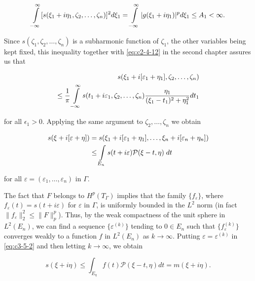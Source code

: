 \[
\intop_{-\infty}^{\infty}[s(\xi_{1}+i\eta_{1},\zeta_{2},\ldots,\zeta_{n})]^{2}d\xi_{1}=\intop_{-\infty}^{\infty}|g(\xi_{1}+i\eta_{1})|^{p}d\xi_{1}\leq A_{1}<\infty.
\]

Since $s(\zeta_1, \zeta_2, \ldots, \zeta_n)$ is a subharmonic function of $\zeta_1$, the other variables being kept fixed, this inequality together with \eqref{eq:c2-4-12} in the second chapter assures us that

\[
\begin{aligned}{s(\xi_{1}+i[\varepsilon_{1}+\eta_{1}],\zeta_{2},\ldots,\zeta_{n})}\\ {\leq\frac{1}{\pi}\intop_{-\infty}^{\infty}s(t_{1}+i\varepsilon_{1},\zeta_{2},\ldots,\zeta_{n})\frac{\eta_{1}}{(\xi_{1}-t_{1})^{2}+\eta_{1}^{2}}d t_{1}}\\ \end{aligned}
\]

for all $\epsilon_1 > 0$. Applying the same argument to $\zeta_2, \ldots, \zeta_n$ we obtain

\begin{equation}\label{eq:c3-5-2}
\begin{aligned}{s(\xi+i[\varepsilon+\eta])}&{{}=s(\xi_{1}+i[\varepsilon_{1}+\eta_{1}],\ldots,\xi_{n}+i[\varepsilon_{n}+\eta_{n}])}\\ {}&{{}\leq\intop_{E_{n}}s(t+i\varepsilon)\mathcal{P}(\xi-t,\eta)\;d t}\\ \end{aligned}
\end{equation}

for all $\varepsilon=(\varepsilon_{1},\ldots,\varepsilon_{n})$ in $\Gamma$.

The fact that $F$ belongs to $H^p(T_\Gamma)$ implies that the family $\{f_\varepsilon\}$, where $f_\varepsilon(t) = s(t + i\varepsilon)$ for $\varepsilon$ in $\Gamma$, is uniformly bounded in the $L^2$ norm (in fact $\|f_\varepsilon\|_2^2 \leq \|F\|_p^p$). Thus, by the weak compactness of the unit sphere in $L^2(E_n)$, we can find a sequence $\{\varepsilon^{(k)}\}$ tending to $0 \in E_n$ such that $\{f_\varepsilon^{(k)}\}$ converges weakly to a function $f$ in $L^2(E_n)$ as $k \to \infty$. Putting $\varepsilon = \varepsilon^{(k)}$ in \eqref{eq:c3-5-2} and then letting $k \to \infty$, we obtain

\begin{equation}\label{eq:c3-5-3}
s(\xi+i\eta)\leq\int_{E_{\eta}}f(t)\mathcal{P}(\xi-t,\eta)d t=m(\xi+i\eta).
\end{equation}

